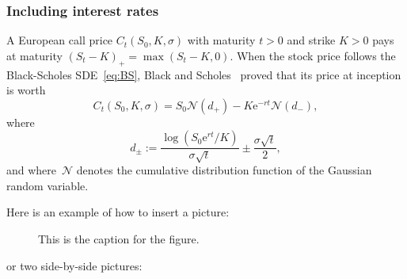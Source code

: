 \documentclass[a4paper]{article}
\theoremstyle{definition}
\newcommand{\E}{\mathrm{e}}
\numberwithin{equation}{section}
\begin{document}
\subsubsection{Including interest rates}
A European call price $C_t(S_0,K,\sigma)$ with maturity $t>0$ and strike $K>0$ 
pays at maturity $(S_t-K)_+=\max(S_t-K,0)$. 
When the stock price follows the Black-Scholes SDE~\eqref{eq:BS}, 
Black and Scholes~\cite{BS73} proved that its price at inception is worth
$$
C_t(S_0,K,\sigma) = S_0\mathcal{N}(d_+) - K\E^{-rt}\mathcal{N}(d_-),
$$
where
$$
d_{\pm} := \frac{\log\left(S_0 \E^{rt}/K\right)}{\sigma\sqrt{t}} \pm \frac{\sigma\sqrt{t}}{2},
$$
and where~$\mathcal{N}$ denotes the cumulative distribution function of the Gaussian random variable.

Here is an example of how to insert a picture:

\begin{figure}[!ht]
\centering
{}
\caption{This is the caption for the figure.}
\label{fig:Pict}
\end{figure}

or two side-by-side pictures:
\end{document}

